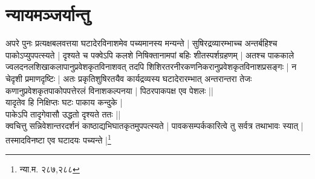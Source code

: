 \section{न्यायमञ्जर्यान्तु} अपरे पुनः प्रत्यक्षबलवत्तया घटादेरविनाशमेव पच्यमानस्य मन्यन्ते | सुषिरद्रव्यारम्भाच्च अन्तर्बहिश्च पाकोऽप्युपपत्स्यते | दृश्यते च पक्वेऽपि कलशे निषिक्तानामपां बहिः शीतस्पर्शग्रहणम् | अतश्च पाककाले ज्वलदनलशिखाकलापानुप्रवेशकृतविनाशवत् तदपि शिशिरतरनीरकणनिकरानुप्रवेशकृतविनाशप्रसङ्गः | न चेदृशी प्रमाणदृष्टिः | अतः प्रकृतिशुषिरतयैव कार्यद्रव्यस्य घटादेरारम्भात् अन्तरान्तरा तेजः कणानुप्रवेशकृतपाकोपपत्तेरलं विनाशकल्पनया | पिठरपाकपक्ष एव पेशलः ||\\ यादृतेव हि निक्षिप्तः घटः पाकाय कन्दुके |\\ पाकेऽपि तादृगेवासौ उद्धतो दृश्यते ततः ||\\ 

क्वचित्तु सन्निवेशान्तरदर्शनं काष्ठाद्यभिघातकृतमुपपत्स्यते | पावकसम्पर्ककारित्वे तु सर्वत्र तथाभावः स्यात् | तस्मादविनष्टा एव घटादयः पच्यन्ते |\footnote{न्या.म. २८७,२८८}




 
